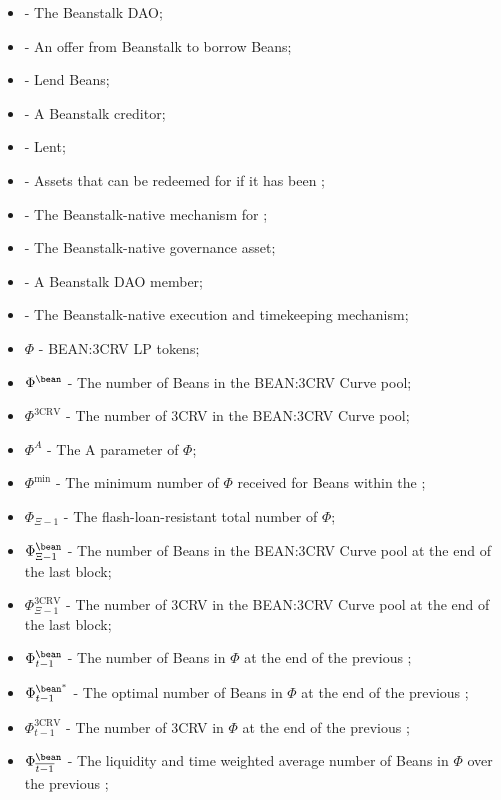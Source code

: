 \documentclass[class=article, crop=false]{standalone}
\begin{document}
\begin{itemize}[topsep=0pt, itemsep=3pt,leftmargin=16pt]
    \item[]  - The Beanstalk DAO;
    \item[]  - An offer from Beanstalk to borrow Beans;
    \item[]  - Lend Beans;
    \item[]  - A Beanstalk creditor;
    \item[]  - Lent;
    \item[]  - Assets that can be redeemed for  if it has been ;
    \item[]  - The Beanstalk-native mechanism for ;
    \item[]  - The Beanstalk-native governance asset;
    \item[]  - A Beanstalk DAO member;
    \item[]  - The Beanstalk-native execution and timekeeping mechanism;
    \item[] $\Phi$ - BEAN:3CRV LP tokens;
    \item[] $\Phi^{\bean}$ - The number of Beans in the BEAN:3CRV Curve pool;
    \item[] $\Phi^{\text{3CRV}}$ - The number of 3CRV in the BEAN:3CRV Curve pool;
    \item[] $\Phi^{A}$ - The A parameter of $\Phi$;
    \item[] $\Phi^{\text{min}}$ - The minimum number of $\Phi$ received for   Beans within the ;
    \item[] $\Phi_{\Xi-1}$ - The flash-loan-resistant total number of $\Phi$;
    \item[] $\Phi_{\Xi-1}^{\bean}$ - The number of Beans in the BEAN:3CRV Curve pool at the end of the last block;
    \item[] $\Phi_{\Xi-1}^{\text{3CRV}}$ - The number of 3CRV in the BEAN:3CRV Curve pool at the end of the last block;
    \item[] $\Phi_{t-1}^{\bean}$ - The number of Beans in $\Phi$ at the end of the previous ;
    \item[] $\Phi_{t-1}^{{\bean}^*}$ - The optimal number of Beans in $\Phi$ at the end of the previous ;
    \item[] $\Phi_{t-1}^{\text{3CRV}}$ - The number of 3CRV in $\Phi$ at the end of the previous ;
    \item[] $\Phi_{\overline{t-1}}^{\bean}$ - The liquidity and time weighted average number of Beans in $\Phi$ over the previous ;

\end{itemize}
\end{document}
